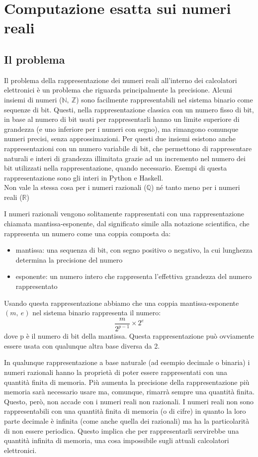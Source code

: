 \documentclass[Lau]{sapthesis}
\begin{document}
\chapter{Computazione esatta sui numeri reali}



\section{Il problema}
Il problema della rappresentazione dei numeri reali all'interno dei calcolatori elettronici è un problema che riguarda principalmente la precisione. Alcuni insiemi di numeri ($\mathbb{N},\ \mathbb{Z}$) sono 
facilmente rappresentabili nel sistema binario come sequenze di bit. Questi, nella rappresentazione classica con un numero fisso di bit, in 
base al numero di bit usati per rappresentarli hanno un limite superiore di 
grandezza (e uno inferiore per i numeri con segno), ma rimangono comunque numeri 
precisi, senza approssimazioni. Per questi due insiemi esistono anche rappresentazioni con un numero variabile di bit, che permettono di rappresentare naturali e interi di grandezza illimitata grazie ad un incremento nel numero dei bit utilizzati nella rappresentazione, quando necessario. Esempi di questa rappresentazione sono gli interi in Python e Haskell.\\Non vale la stessa cosa per i numeri razionali 
($\mathbb{Q}$) né tanto meno per i numeri reali ($\mathbb{R}$)

I numeri razionali vengono solitamente rappresentati con una rappresentazione 
chiamata mantissa-esponente, dal significato simile alla notazione 
scientifica, che rappresenta un numero come una coppia composta da:
\begin{itemize}
	\item mantissa: una sequenza di bit, con segno positivo o negativo, la cui 
lunghezza determina la precisione del numero
	\item esponente: un numero intero che rappresenta l'effettiva grandezza del 
numero rappresentato
\end{itemize}
Usando questa rappresentazione abbiamo che una coppia mantissa-esponente $\left(m,\ e\right)$ nel sistema binario rappresenta il numero:
$$\frac{m}{2^{p-1}} \times 2^e$$
dove p è il numero di bit della mantissa. Questa rappresentazione può ovviamente essere usata con qualunque altra base 
diversa da 2.

\medskip

In qualunque rappresentazione a base naturale (ad esempio decimale o binaria) i numeri razionali hanno la proprietà di poter essere rappresentati con una 
quantità finita di memoria. Più aumenta la precisione della rappresentazione più memoria sarà necessario usare ma, comunque, 
rimarrà sempre una quantità finita. Questo, però, non accade con i numeri 
reali non razionali. I numeri reali non sono rappresentabili con una quantità 
finita di memoria (o di cifre) in quanto la loro parte decimale è infinita (come 
anche quella dei razionali) ma ha la particolarità di non essere periodica. 
Questo implica che per rappresentarli servirebbe una quantità infinita di 
memoria, una cosa impossibile sugli attuali calcolatori elettronici.
\end{document}
